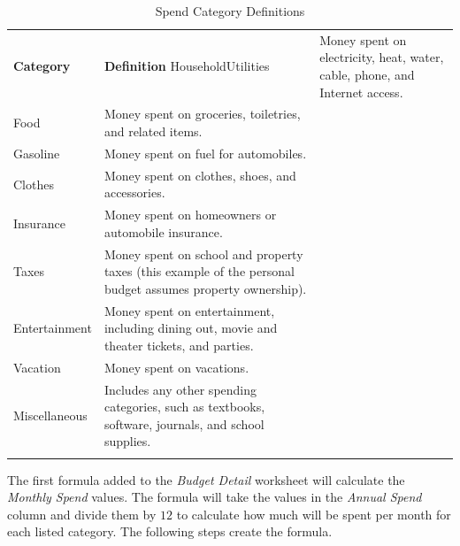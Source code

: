 \begin{table}[H]
	{\small
		\begin{longtable}{L{0.85in}L{3.40in}} %
			\textbf{Category} & \textbf{Definition} \endhead
			\hline
			Household\newline Utilities & Money spent on electricity, heat, water, cable, phone, and Internet access.\\
			Food & Money spent on groceries, toiletries, and related items.\\
			Gasoline & Money spent on fuel for automobiles.\\
			Clothes & Money spent on clothes, shoes, and accessories.\\
			Insurance & Money spent on homeowners or automobile insurance.\\
			Taxes & Money spent on school and property taxes (this example of the personal budget assumes property ownership).\\
			Entertainment & Money spent on entertainment, including dining out, movie and theater tickets, and parties.\\
			Vacation & Money spent on vacations.\\
			Miscellaneous & Includes any other spending categories, such as textbooks, software, journals, and school supplies.\\
			\caption{Spend Category Definitions}
			\label{02:tab01}
		\end{longtable}
	} %
\end{table}

The first formula added to the \textit{Budget Detail} worksheet will calculate the \textit{Monthly Spend} values. The formula will take the values in the \textit{Annual Spend} column and divide them by $ 12 $ to calculate how much will be spent per month for each listed category. The following steps create the formula.

